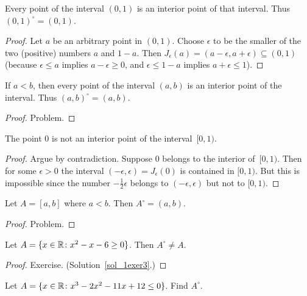 \begin{exam} Every point of the interval $(0,1)$ is an interior point of that interval.  Thus
$(0,1)^\circ = (0,1)$.
\end{exam}

\begin{proof} Let $a$ be an arbitrary point in $(0,1)$.  Choose $\epsilon$ to be the smaller of
the two (positive) numbers $a$ and $1-a$.  Then $J_\epsilon(a) = (a - \epsilon, a + \epsilon)
\subseteq (0,1)$ (because $\epsilon \le a$ implies $a-\epsilon \ge 0$, and $\epsilon \le 1-a$
implies $a+\epsilon \le 1$).
\end{proof}

\begin{exam}\label{interior_open_int} If $a < b$, then every point of the interval $(a,b)$ is an
interior point of the interval.  Thus $(a,b)^\circ = (a,b)$.
\end{exam}

\begin{proof} Problem. \ns  \end{proof}

\begin{exam} The point $0$ is not an interior point of the interval~$[0,1)$.
\end{exam}

\begin{proof} Argue by contradiction.  Suppose $0$ belongs to the interior of~$[0,1)$.  Then for
some $\epsilon > 0$ the interval $(-\epsilon,\epsilon) = J_\epsilon(0)$ is contained in
$[0,1)$. But this is impossible since the number $-\frac12\epsilon$ belongs to
$(-\epsilon,\epsilon)$ but not to $[0,1)$.
\end{proof}

\begin{exam} Let $A = [a,b]$ where $a < b$.  Then $A^\circ = (a,b)$.
\end{exam}

\begin{proof} Problem. \ns \end{proof}

\begin{exam}\label{1exer3} Let $A = \{x \in \mathbb{R}\colon x^2-x-6 \ge 0\}$.  Then $A^\circ \ne A$.
\end{exam}

\begin{proof} Exercise. (Solution~\ref{sol_1exer3}.)
  \ns \end{proof}

\begin{prob} Let $A = \{x \in \mathbb{R}\colon x^3 - 2x^2 - 11x + 12 \le 0\}$.  Find $A^\circ$.
\end{prob}

